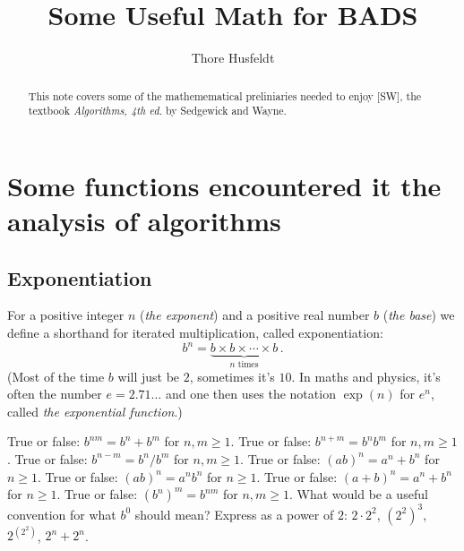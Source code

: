\documentclass{tufte-handout}
\title{Some Useful Math for BADS}
\author{Thore Husfeldt}
\begin{document}
\maketitle
\begin{abstract}
  This note covers some of the mathemematical preliniaries needed to
  enjoy [SW], the textbook \emph{Algorithms, 4th ed.} by Sedgewick and
  Wayne.
\end{abstract}

\section{Some functions encountered it the analysis of algorithms}
\label{sec-1.1}

\subsection{Exponentiation}

For a positive integer $n$ (\emph{the exponent}) and a positive real
number $b$ (\emph{the base}) we define a shorthand for iterated
multiplication, called exponentiation:
\[ b^n = \underbrace{b\times b\times \cdots\times b}_{n \text{ times}}\,.\] 
(Most of the time $b$ will just be $2$, sometimes it's $10$. In maths
and physics, it's often the number $e=2.71\ldots$ and one then uses
the notation $\exp(n)$ for $e^n$, called \emph{the exponential function}.)


\begin{marginfigure}
\end{marginfigure}

\begin{ExerciseList}
\Exercise True or false: $b^{nm}=b^n+b^m$ for $n,m\geq 1$.
\Exercise True or false: $b^{n+m}=b^nb^m$ for $n,m\geq 1$.
\Exercise True or false:  $b^{n-m}=b^n/b^m$ for $n,m\geq 1$.
\Exercise True or false: $(ab)^{n}=a^n+b^n$ for $n\geq 1$.
\Exercise True or false: $(ab)^{n}=a^nb^n$ for $n\geq 1$.
\Exercise True or false: $(a+b)^{n}=a^n+b^n$ for $n\geq 1$.
\Exercise True or false: $(b^n)^m=b^{nm}$ for $n,m\geq 1$.
\Exercise What would be a useful convention for what $b^0$ should
mean?
\Exercise Express as a power of $2$: $2\cdot 2^2$, $(2^2)^3$,
$2^{(2^2)}$, $2^n+ 2^n$.
\end{ExerciseList}
\end{document}
